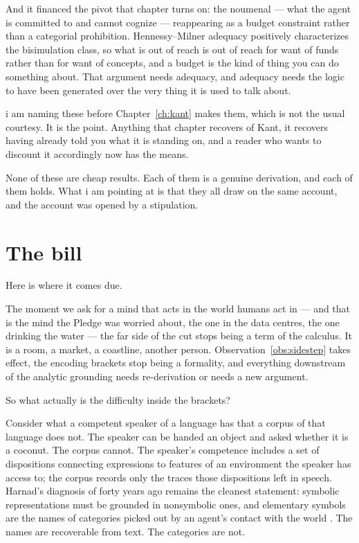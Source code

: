 And it financed the pivot that chapter turns on: the noumenal ---
what the agent is committed to and cannot cognize --- reappearing
as a budget constraint rather than a categorial prohibition.
Hennessy--Milner adequacy positively characterizes the bisimulation
class, so what is out of reach is out of reach for want of funds
rather than for want of concepts, and a budget is the kind of thing
you can do something about.
That argument needs adequacy, and adequacy needs the logic to have
been generated over the very thing it is used to talk about.

i am naming these before Chapter~\ref{ch:kant} makes them, which is
not the usual courtesy.
It is the point.
Anything that chapter recovers of Kant, it recovers having already
told you what it is standing on, and a reader who wants to discount
it accordingly now has the means.

None of these are cheap results.
Each of them is a genuine derivation, and each of them holds.
What i am pointing at is that they all draw on the same account,
and the account was opened by a stipulation.

\section{The bill}
\label{sec:the-bill}

Here is where it comes due.

The moment we ask for a mind that acts in the world humans act in
--- and that is the mind the Pledge was worried about, the one in
the data centres, the one drinking the water --- the far side of
the cut stops being a term of the calculus.
It is a room, a market, a coastline, another person.
Observation~\ref{obs:sidestep} takes effect, the encoding brackets
stop being a formality, and everything downstream of the analytic
grounding needs re-derivation or needs a new argument.

So what actually is the difficulty inside the brackets?

Consider what a competent speaker of a language has that a corpus
of that language does not.
The speaker can be handed an object and asked whether it is a
coconut.
The corpus cannot.
The speaker's competence includes a set of dispositions connecting
expressions to features of an environment the speaker has access
to; the corpus records only the traces those dispositions left in
speech.
Harnad's diagnosis of forty years ago remains the cleanest
statement: symbolic representations must be grounded in nonsymbolic
ones, and elementary symbols are the names of categories picked out
by an agent's contact with the world \cite{harnad1990}.
The names are recoverable from text.
The categories are not.

